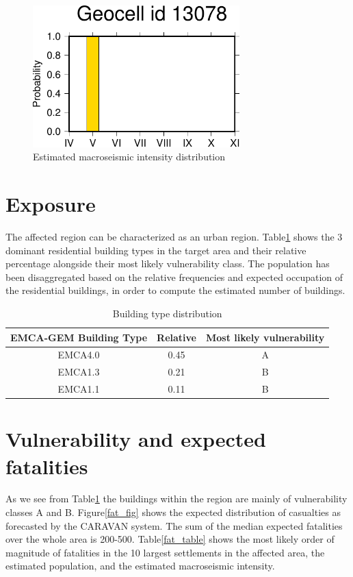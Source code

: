 \documentclass{article}
\begin{document}
\begin{figure}[h!]
\centering
\includegraphics[width=8cm]{gm_barplot.pdf}
\caption{Estimated macroseismic intensity distribution}
\label{gm_barplot}
\end{figure}


\section*{Exposure}
The affected region can be characterized as an urban region.
Table\ref{bt_table} shows the 3 dominant residential building types in the target area and their relative percentage alongside their most likely vulnerability class.
The population has been disaggregated based on the relative frequencies and expected occupation of the residential buildings, in order to compute the estimated number of buildings.

\begin{table}[h!]
\caption{Building type distribution}
\label{bt_table}
\begin{tabular}{c|c|c}
\hline
EMCA{-}GEM Building Type&Relative&Most likely vulnerability\\
\hline
EMCA4.0 & 0.45 & A \\
EMCA1.3 & 0.21 & B \\
EMCA1.1 & 0.11 & B \\
\hline
\end{tabular}
\end{table}


\section*{Vulnerability and expected fatalities}
As we see from Table\ref{bt_table} the buildings within the region are mainly of vulnerability classes A and B.
Figure\ref{fat_fig} shows the expected distribution of casualties as forecasted by the CARAVAN system.
The sum of the median expected fatalities over the whole area is 200-500.
Table\ref{fat_table} shows the most likely order of magnitude of fatalities in the 10 largest settlements in the affected area, the estimated population, and the estimated macroseismic intensity.
\end{document}
